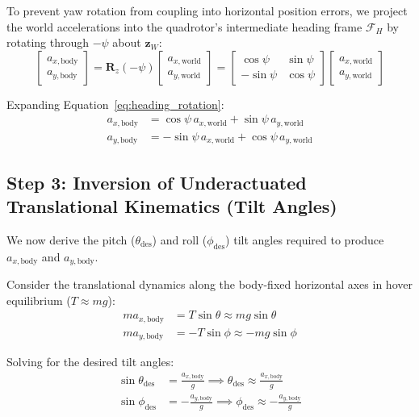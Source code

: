 \documentclass[11pt,a4paper]{article}
\begin{document}
To prevent yaw rotation from coupling into horizontal position errors, we project the world accelerations into the quadrotor's intermediate heading frame $\mathcal{F}_H$ by rotating through $-\psi$ about $\mathbf{z}_W$:
\begin{equation}
\begin{bmatrix} a_{x,\mathrm{body}} \\ a_{y,\mathrm{body}} \end{bmatrix} =
\mathbf{R}_z(-\psi) \begin{bmatrix} a_{x,\mathrm{world}} \\ a_{y,\mathrm{world}} \end{bmatrix} =
\begin{bmatrix}
\cos\psi & \sin\psi \\
-\sin\psi & \cos\psi
\end{bmatrix}
\begin{bmatrix} a_{x,\mathrm{world}} \\ a_{y,\mathrm{world}} \end{bmatrix}
\label{eq:heading_rotation}
\end{equation}

Expanding Equation~\eqref{eq:heading_rotation}:
\begin{align}
a_{x,\mathrm{body}} &= \cos\psi \, a_{x,\mathrm{world}} + \sin\psi \, a_{y,\mathrm{world}} \\
a_{y,\mathrm{body}} &= -\sin\psi \, a_{x,\mathrm{world}} + \cos\psi \, a_{y,\mathrm{world}}
\end{align}

\subsection{Step 3: Inversion of Underactuated Translational Kinematics (Tilt Angles)}
We now derive the pitch ($\theta_{\mathrm{des}}$) and roll ($\phi_{\mathrm{des}}$) tilt angles required to produce $a_{x,\mathrm{body}}$ and $a_{y,\mathrm{body}}$.

Consider the translational dynamics along the body-fixed horizontal axes in hover equilibrium ($T \approx mg$):
\begin{align}
m a_{x,\mathrm{body}} &= T \sin\theta \approx mg \sin\theta \\
m a_{y,\mathrm{body}} &= -T \sin\phi \approx -mg \sin\phi
\end{align}

Solving for the desired tilt angles:
\begin{align}
\sin\theta_{\mathrm{des}} &= \frac{a_{x,\mathrm{body}}}{g} \implies \theta_{\mathrm{des}} \approx \frac{a_{x,\mathrm{body}}}{g} \label{eq:pitch_des} \\
\sin\phi_{\mathrm{des}}  &= -\frac{a_{y,\mathrm{body}}}{g} \implies \phi_{\mathrm{des}} \approx -\frac{a_{y,\mathrm{body}}}{g} \label{eq:roll_des}
\end{align}
\end{document}
